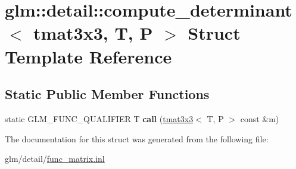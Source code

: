 \hypertarget{structglm_1_1detail_1_1compute__determinant_3_01tmat3x3_00_01T_00_01P_01_4}{\section{glm\-:\-:detail\-:\-:compute\-\_\-determinant$<$ tmat3x3, T, P $>$ Struct Template Reference}
\label{structglm_1_1detail_1_1compute__determinant_3_01tmat3x3_00_01T_00_01P_01_4}
}
\subsection*{Static Public Member Functions}
\begin{DoxyCompactItemize}
\item 
\hypertarget{structglm_1_1detail_1_1compute__determinant_3_01tmat3x3_00_01T_00_01P_01_4_a7531e9b1c92f41585a5d7667679084b3}{static G\-L\-M\-\_\-\-F\-U\-N\-C\-\_\-\-Q\-U\-A\-L\-I\-F\-I\-E\-R T {\bfseries call} (\hyperlink{structglm_1_1tmat3x3}{tmat3x3}$<$ T, P $>$ const \&m)}\label{structglm_1_1detail_1_1compute__determinant_3_01tmat3x3_00_01T_00_01P_01_4_a7531e9b1c92f41585a5d7667679084b3}

\end{DoxyCompactItemize}


The documentation for this struct was generated from the following file\-:\begin{DoxyCompactItemize}
\item 
glm/detail/\hyperlink{func__matrix_8inl}{func\-\_\-matrix.\-inl}\end{DoxyCompactItemize}
